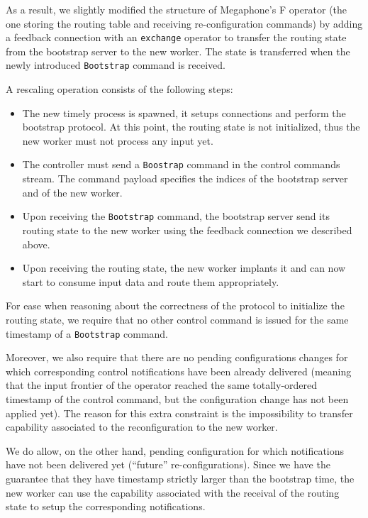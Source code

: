 \documentclass[12pt]{extarticle}
\begin{document}
As a result, we slightly modified the structure of Megaphone's F operator (the one storing the routing table
and receiving re-configuration commands) by adding a feedback connection with an \verb|exchange| operator
to transfer the routing state from the bootstrap server to the new worker. The state is transferred
when the newly introduced \verb|Bootstrap| command is received.

A rescaling operation consists of the following steps:
\begin{itemize}
    \item The new timely process is spawned, it setups connections and perform the bootstrap protocol. At this
        point, the routing state is not initialized, thus the new worker must not process any input yet.
    \item The controller must send a \verb|Boostrap| command in the control commands stream. The command
        payload specifies the indices of the bootstrap server and of the new worker.
    \item Upon receiving the \verb|Bootstrap| command, the bootstrap server send its routing state to the
        new worker using the feedback connection we described above.
    \item Upon receiving the routing state, the new worker implants it and can now start to consume input data
        and route them appropriately.
\end{itemize}

For ease when reasoning about the correctness of the protocol to initialize the routing state,
we require that no other control command is issued for the same timestamp of a \verb|Bootstrap| command.

Moreover, we also require that there are no pending configurations changes for which corresponding
control notifications have been already delivered (meaning that the input frontier of the operator reached the
same totally-ordered timestamp of the control command, but the configuration change has not been applied yet).
The reason for this extra constraint is the impossibility to transfer capability associated to the
reconfiguration to the new worker.

We do allow, on the other hand, pending configuration for which notifications have not been delivered yet (``future''
re-configurations). Since we have the guarantee that they have timestamp strictly larger than the bootstrap time,
the new worker can use the capability associated with the receival of the
routing state to setup the corresponding notifications.
\end{document}
